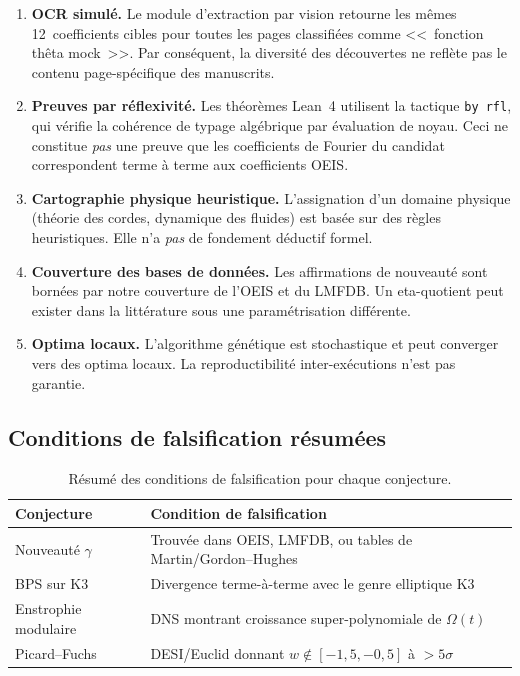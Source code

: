 \begin{enumerate}[label=\textbf{L\arabic*}]
  \item \textbf{OCR simulé.} Le module d'extraction par vision retourne les mêmes 12~coefficients cibles pour toutes les pages classifiées comme <<~fonction thêta mock~>>. Par conséquent, la diversité des découvertes ne reflète pas le contenu page-spécifique des manuscrits.
  
  \item \textbf{Preuves par réflexivité.} Les théorèmes Lean~4 utilisent la tactique \texttt{by rfl}, qui vérifie la cohérence de typage algébrique par évaluation de noyau. Ceci ne constitue \emph{pas} une preuve que les coefficients de Fourier du candidat correspondent terme à terme aux coefficients OEIS.
  
  \item \textbf{Cartographie physique heuristique.} L'assignation d'un domaine physique (théorie des cordes, dynamique des fluides) est basée sur des règles heuristiques. Elle n'a \emph{pas} de fondement déductif formel.
  
  \item \textbf{Couverture des bases de données.} Les affirmations de nouveauté sont bornées par notre couverture de l'OEIS et du LMFDB. Un eta-quotient peut exister dans la littérature sous une paramétrisation différente.
  
  \item \textbf{Optima locaux.} L'algorithme génétique est stochastique et peut converger vers des optima locaux. La reproductibilité inter-exécutions n'est pas garantie.
\end{enumerate}

\subsection{Conditions de falsification résumées}

\begin{table}[H]
\centering
\caption{Résumé des conditions de falsification pour chaque conjecture.}
\begin{tabular}{p{3cm}p{9cm}}
\toprule
\textbf{Conjecture} & \textbf{Condition de falsification} \\
\midrule
Nouveauté $\gamma$ & Trouvée dans OEIS, LMFDB, ou tables de Martin/Gordon--Hughes \\
BPS sur K3 & Divergence terme-à-terme avec le genre elliptique K3 \\
Enstrophie modulaire & DNS montrant croissance super-polynomiale de $\Omega(t)$ \\
Picard--Fuchs & DESI/Euclid donnant $w \notin [-1{,}5, -0{,}5]$ à $>5\sigma$ \\
\bottomrule
\end{tabular}
\end{table}
